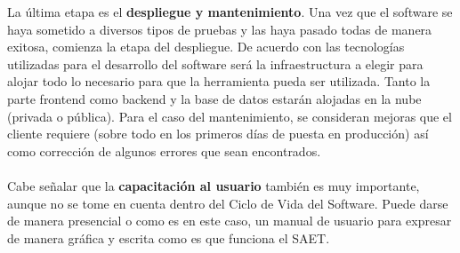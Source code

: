  La última etapa es el \textbf{despliegue y mantenimiento}. Una vez que el software se haya sometido a diversos tipos de pruebas y las haya pasado todas de manera exitosa, comienza la etapa del despliegue. De acuerdo con las tecnologías utilizadas para el desarrollo del software será la infraestructura a elegir para alojar todo lo necesario para que la herramienta pueda ser utilizada. Tanto la parte frontend como backend y la base de datos estarán alojadas en la nube (privada o pública). Para el caso del mantenimiento, se consideran mejoras que el cliente requiere (sobre todo en los primeros días de puesta en producción) así como corrección de algunos errores que sean encontrados. 
 \\ \\
 Cabe señalar que la \textbf{capacitación al usuario} también es muy importante, aunque no se tome en cuenta dentro del Ciclo de Vida del Software. Puede darse de manera presencial o como es en este caso, un manual de usuario para expresar de manera gráfica y escrita como es que funciona el SAET.